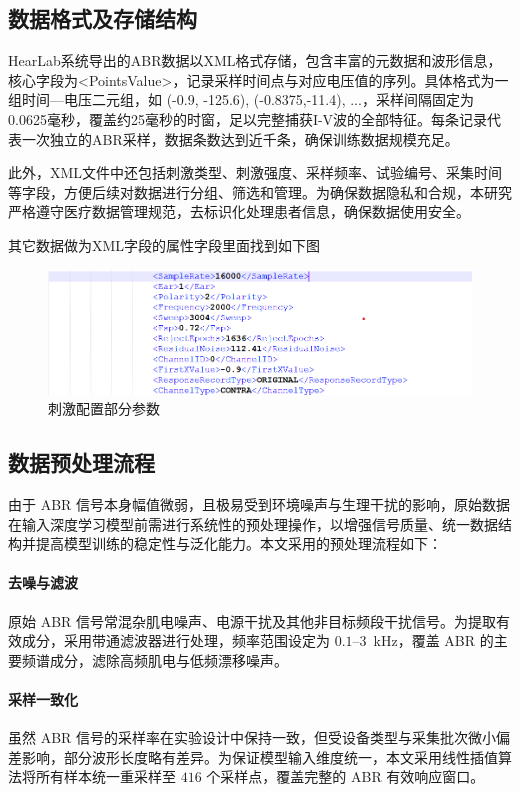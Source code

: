 \subsection*{数据格式及存储结构}
HearLab系统导出的ABR数据以XML格式存储，包含丰富的元数据和波形信息，核心字段为<PointsValue>，记录采样时间点与对应电压值的序列。具体格式为一组时间—电压二元组，如 (-0.9, -125.6), (-0.8375,-11.4),  ...，采样间隔固定为0.0625毫秒，覆盖约25毫秒的时窗，足以完整捕获I-V波的全部特征。每条记录代表一次独立的ABR采样，数据条数达到近千条，确保训练数据规模充足。

此外，XML文件中还包括刺激类型、刺激强度、采样频率、试验编号、采集时间等字段，方便后续对数据进行分组、筛选和管理。为确保数据隐私和合规，本研究严格遵守医疗数据管理规范，去标识化处理患者信息，确保数据使用安全。

其它数据做为XML字段的属性字段里面找到如下图
\begin{figure}[H]
  \centering
  \includegraphics[width=1\textwidth]{images/hearlabParameterSettings.png}
  \caption{刺激配置部分参数}
  \label{fig:hearlabRunStimiousParameters}
\end{figure}


\subsection*{数据预处理流程}

由于 ABR 信号本身幅值微弱，且极易受到环境噪声与生理干扰的影响，原始数据在输入深度学习模型前需进行系统性的预处理操作，以增强信号质量、统一数据结构并提高模型训练的稳定性与泛化能力。本文采用的预处理流程如下：

\paragraph*{去噪与滤波}
原始 ABR 信号常混杂肌电噪声、电源干扰及其他非目标频段干扰信号。为提取有效成分，采用带通滤波器进行处理，频率范围设定为 $0.1$–$3$~kHz，覆盖 ABR 的主要频谱成分，滤除高频肌电与低频漂移噪声。

\paragraph*{采样一致化}
虽然 ABR 信号的采样率在实验设计中保持一致，但受设备类型与采集批次微小偏差影响，部分波形长度略有差异。为保证模型输入维度统一，本文采用线性插值算法将所有样本统一重采样至 $416$ 个采样点，覆盖完整的 ABR 有效响应窗口。

